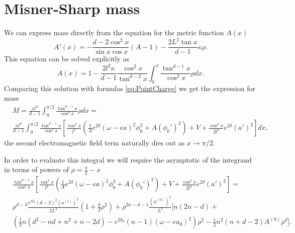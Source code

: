 \documentclass[a4paper,12pt]{article}
\begin{document}
\section{Misner-Sharp mass}
We can express mass directly from the equation for the metric function $A(x)$
\begin{equation}
	A'(x) = - \frac{d - 2 \cos^2 x}{\sin x \cos x}\left(A - 1\right) - \frac{2 L^2\tan x}{d-1}\kappa \rho.
\end{equation}
This equation can be solved explicitly as
\begin{equation}
	A(x) = 1 - \frac{2 l^2 \kappa}{d-1}\frac{\cos^2 x}{\tan^{d-2} x} \int_0^x \frac{\tan^{d-1}x}{\cos^2 x} \rho dx.
\end{equation}
Comparing this solution with formulas \eqref{eq:PointCharge} we get the expression for mass
\begin{equation}
	\begin{split}
		&M = \frac{\kappa l^d}{d-1} \int_0^{\pi/2} \frac{\tan^{d-1}x}{\cos^2 x} \rho dx = \\
		&\frac{\kappa l^d}{d-1} \int_0^{\pi/2} \frac{\tan^{d-1}x}{\cos^2 x} \left[\frac{\cos^2 x}{l^2}\left(\frac{1}{A}e^{2\delta}(\omega - e a)^2 \phi_0^2 + A(\phi_0')^2\right) + V + \frac{\cos^4 x}{2l^4} e^{2\delta} (a')^2\right] dx,
	\end{split}
\end{equation}
the second electromagnetic field term naturally dies out as $x\to \pi/2$.

In order to evaluate this integral we will require the asymptotic of the integrand in terms of powers of $\rho = \frac{\pi}{2} - x$
\begin{equation}
	\begin{split}
		&\frac{\tan^{d-1}x}{\cos^2 x} \left[\frac{\cos^2 x}{l^2}\left(\frac{1}{A}e^{2\delta}(\omega - e a)^2
		\phi_0^2 + A(\phi_0')^2\right) + V + \frac{\cos^4 x}{2l^4} e^{2\delta} (a')^2\right] = \\
		&\rho^{d-3}\frac{e^{2\delta_0} (d-2)^2 (a^{(1)})^2 }{2 L^4}\left(1 + \frac{d}{2} \rho^2\right) + \rho^{2n - d - 1} \frac{(\phi^{(0)})^2}{L^2}\bigg[n(2n - d) + \\
		&\left(\frac{1}{3}n(d^2 - nd + n^2 + n - 2d) - e^{2\delta_0}(n-1)(\omega - e a_0)^2\right)\rho^2 - \frac{1}{2} n^2 (n + d - 2)A^{(0)}\rho^d\bigg].
	\end{split}
\end{equation}
\end{document}
